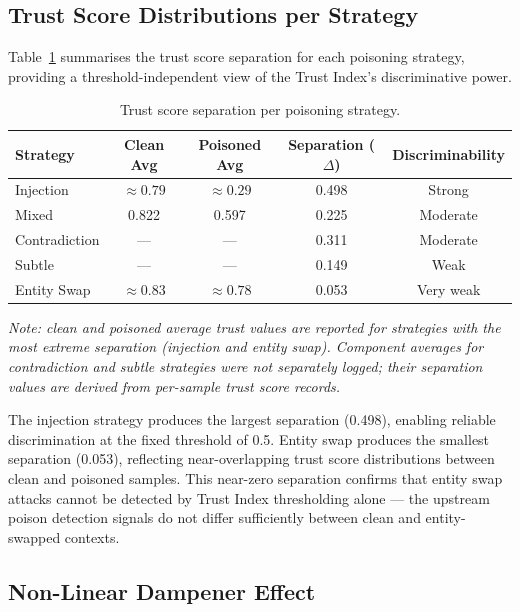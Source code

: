 \subsection{Trust Score Distributions per Strategy}

Table~\ref{tab:separation} summarises the trust score separation for each poisoning
strategy, providing a threshold-independent view of the Trust Index's discriminative power.

\begin{table}[h]
\centering
\caption{Trust score separation per poisoning strategy.}
\label{tab:separation}
\begin{tabular}{lcccc}
\hline
\textbf{Strategy} & \textbf{Clean Avg} & \textbf{Poisoned Avg}
    & \textbf{Separation ($\Delta$)} & \textbf{Discriminability} \\
\hline
Injection     & $\approx 0.79$ & $\approx 0.29$ & 0.498 & Strong    \\
Mixed         & 0.822          & 0.597          & 0.225 & Moderate  \\
Contradiction & ---            & ---            & 0.311 & Moderate  \\
Subtle        & ---            & ---            & 0.149 & Weak      \\
Entity Swap   & $\approx 0.83$ & $\approx 0.78$ & 0.053 & Very weak \\
\hline
\end{tabular}
\end{table}
\small\textit{Note: clean and poisoned average trust values are reported for strategies
with the most extreme separation (injection and entity swap). Component averages for
contradiction and subtle strategies were not separately logged; their separation values
are derived from per-sample trust score records.}

\normalsize
The injection strategy produces the largest separation (0.498), enabling reliable
discrimination at the fixed threshold of 0.5. Entity swap produces the smallest separation
(0.053), reflecting near-overlapping trust score distributions between clean and poisoned
samples. This near-zero separation confirms that entity swap attacks cannot be detected
by Trust Index thresholding alone --- the upstream poison detection signals do not differ
sufficiently between clean and entity-swapped contexts.

\subsection{Non-Linear Dampener Effect}


